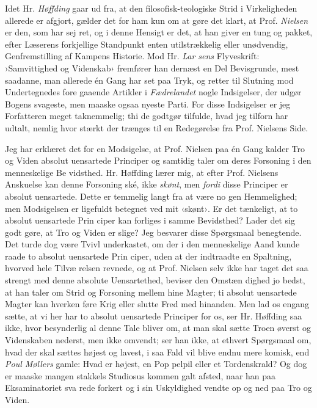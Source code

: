 \documentclass[12pt,a4paper,openany]{book}
\newcommand{\opage}[1]{\marginnote{\footnotesize\textit{[#1]}}}
\begin{document}
Idet Hr. \emph{Høffding} gaar ud fra, at den filosofisk-teologiske
Strid i Virkeligheden allerede er afgjort, gælder det for ham
kun om at gøre det klart, at Prof. \emph{Nielsen} er den, som har sej\-%
ret, og i denne Hensigt er det, at han giver en tung og pakket,
efter Læserens forkjellige Standpunkt enten utilstrækkelig eller
unødvendig, Genfremstilling af Kampens Historie. Mod Hr. \emph{Lar\-%
sens} Flyveskrift:
›Samvittighed og Videnskab› fremfører han dernæst
en Del Bevisgrunde, mest saadanne, man allerede én Gang har
set paa Tryk, og retter til Slutning mod Undertegnedes fore\-%
gaaende Artikler i \emph{Fædrelandet} nogle Indsigelser, der udgør Bogens
svageste, men maaske ogsaa nyeste Parti. For disse Indsigelser
er jeg Forfatteren meget taknemmelig; thi de godtgør tilfulde,
hvad jeg tilforn har udtalt, nemlig hvor stærkt der trænges til
en Redegørelse fra Prof. Nielsens Side.

Jeg har erklæret det for en Modsigelse, at Prof. Nielsen
paa én Gang kalder Tro og Viden absolut uensartede Principer
\opage{14}og samtidig taler om deres Forsoning i den menneskelige Be\-%
vidsthed. Hr. Høffding lærer mig, at efter Prof. Nielsens Anskuelse
kan denne Forsoning ské, ikke \emph{skønt}, men \emph{fordi} disse Principer
er absolut uensartede. Dette er temmelig langt fra at være no\-%
gen Hemmelighed; men Modsigelsen er ligefuldt betegnet ved
mit ‹skønt›. Er det tænkeligt, at to absolut uensartede Prin\-%
ciper kan forliges i samme Bevidsthed? Lader det sig godt\-%
gøre, at Tro og Viden er slige? Jeg besvarer disse Spørgsmaal
benegtende. Det turde dog være Tvivl underkastet, om der i
den menneskelige Aand kunde raade to absolut uensartede Prin\-%
ciper, uden at der indtraadte en Spaltning, hvorved hele Tilvæ\-%
relsen revnede, og at Prof. Nielsen selv ikke har taget det saa
strengt med denne absolute Uensartethed, beviser den Omstæn\-%
dighed jo bedst, at han taler om Strid og Forsoning mellem
hine Magter; ti absolut uensartede Magter kan hverken føre
Krig eller slutte Fred med hinanden. Men lad os engang
sætte, at vi her har to absolut uensartede Principer for os, ser
Hr. Høffding saa ikke, hvor besynderlig al denne Tale bliver
om, at man skal sætte Troen øverst og Videnskaben nederst,
men ikke omvendt; ser han ikke, at ethvert Spørgsmaal om,
hvad der skal sættes højest og lavest, i saa Fald vil blive endnu
mere komisk, end \emph{Poul Møllers} gamle: Hvad er højest, en Pop\-%
pelpil eller et Tordenskrald? Og dog er maaske mangen stakkels
Studiosus kommen galt afsted, naar han paa Eksaminatoriet sva\-%
rede forkert og i sin Uskyldighed vendte op og ned paa Tro og
Viden.
\end{document}
